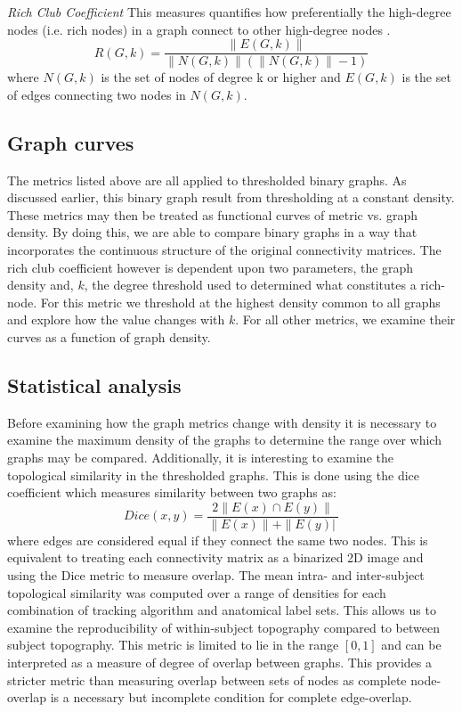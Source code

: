 \documentclass{frontiersSCNS} %
\begin{document}
\emph{Rich Club Coefficient}
This measures quantifies how preferentially the high-degree nodes (i.e. rich nodes)  in a graph connect to other high-degree nodes \citep{Colizza2006}.
$$ R(G,k) = \frac{ \|E(G,k)\| }{ \|N(G,k)\| ( \|N(G,k)\|-1 ) } $$
where $N(G,k)$ is the set of nodes of degree k or higher and $E(G,k)$ is the set of edges connecting two nodes in $N(G,k)$.


\subsection{Graph curves}
The metrics listed above are all applied to thresholded binary graphs. As discussed earlier, this binary graph result from thresholding at a constant density. These metrics may then be treated as functional curves of metric vs. graph density. By doing this, we are able to compare binary graphs in a way that incorporates the continuous structure of the original connectivity matrices. The rich club coefficient however is dependent upon two parameters, the graph density and, $k$, the degree threshold used to determined what constitutes a rich-node. For this metric we threshold at the highest density common to all graphs and explore how the value changes with $k$. For all other metrics, we examine their curves as a function of graph density. 

\subsection{Statistical analysis}
Before examining how the graph metrics change with density it is necessary to examine the maximum density of the graphs to determine the range over which graphs may be compared. Additionally, it is interesting to examine the topological similarity in the thresholded graphs. This is done using the dice coefficient which measures similarity between two graphs as:
$$Dice(x,y) = \frac{ 2 \| E(x) \cap E(y) \| }{ \|E(x) \| + \| E(y) |\ }$$
where edges are considered equal if they connect the same two
nodes. This is equivalent to treating each connectivity matrix as
a binarized 2D image and using the Dice metric to measure overlap. The mean intra- and inter-subject topological similarity 
was computed over a range of densities for each combination of tracking algorithm and anatomical label sets. This allows us to 
examine the reproducibility of within-subject topography compared to between subject topography. This metric is limited to lie in the range $[0,1]$ and can be interpreted as a measure of degree of overlap between graphs. This provides a stricter metric than measuring overlap between sets of nodes as complete node-overlap is a necessary but incomplete condition for complete edge-overlap.
\end{document}
